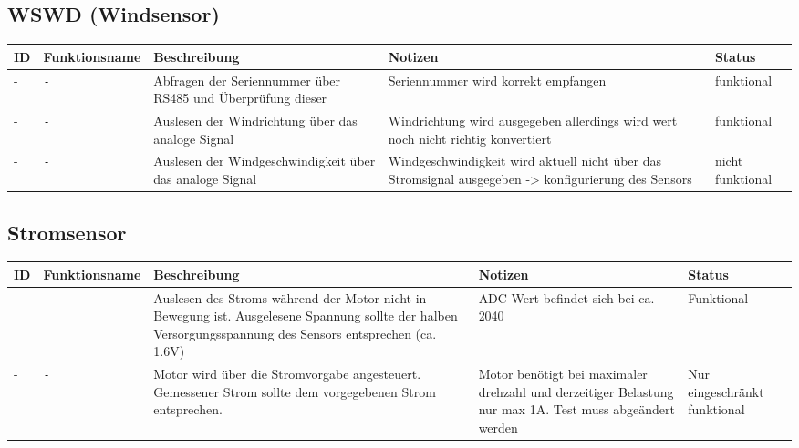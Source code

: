 \documentclass{article}
\begin{document}
	\subsection{WSWD (Windsensor)}
		\begin{tabular}{|p{0.6cm}|p{3.2cm}|p{5.5cm}|p{3cm}|p{1.6cm}|}
			\hline
				\textbf{ID} & \textbf{Funktionsname} & \textbf{Beschreibung} & \textbf{Notizen} & \textbf{Status} \\
			\hline
				- &\texttt{-} & Abfragen der Seriennummer über RS485 und Überprüfung dieser & Seriennummer wird korrekt empfangen & funktional \\
			\hline
				- &\texttt{-} & Auslesen der Windrichtung über das analoge Signal & Windrichtung wird ausgegeben allerdings wird wert noch nicht richtig konvertiert & funktional \\
			\hline
				- &\texttt{-} & Auslesen der Windgeschwindigkeit über das analoge Signal & Windgeschwindigkeit wird aktuell nicht über das Stromsignal ausgegeben -> konfigurierung des Sensors & nicht funktional \\
			\hline
		\end{tabular}
	\subsection{Stromsensor}
		\begin{tabular}{|p{0.6cm}|p{3.2cm}|p{5.5cm}|p{3cm}|p{1.6cm}|}
			\hline
				\textbf{ID} & \textbf{Funktionsname} & \textbf{Beschreibung} & \textbf{Notizen} & \textbf{Status} \\
			\hline
				- &\texttt{-} & Auslesen des Stroms während der Motor nicht in Bewegung ist. Ausgelesene Spannung sollte der halben Versorgungsspannung des Sensors entsprechen (ca. 1.6V) & ADC Wert befindet sich bei ca. 2040 & Funktional \\
			\hline
				- &\texttt{-} & Motor wird über die Stromvorgabe angesteuert. Gemessener Strom sollte dem vorgegebenen Strom entsprechen. & Motor benötigt bei maximaler drehzahl und derzeitiger Belastung nur max 1A. Test muss abgeändert werden & Nur eingeschränkt funktional \\
			\hline
		\end{tabular} 
\end{document}
